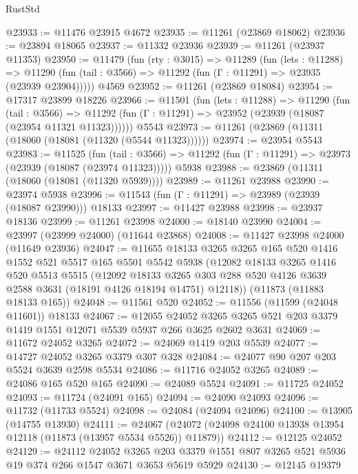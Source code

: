 \begin{lexlean}{RustStd}
\begin{coremodule}
@23933 := @11476 @23915 @4672
@23935 := @11261 (@23869 @18062)
@23936 := @23894 @18065
@23937 := @11332 @23936
@23939 := @11261 (@23937 @11353)
@23950 := @11479
    (fun (rty : @3015) =>
    @11289
      (fun (lets : @11288) =>
      @11290 (fun (tail : @3566) => @11292 (fun (Γ : @11291) => @23935 (@23939 @23904)))))
    @4569
@23952 := @11261 (@23869 @18084)
@23954 := @17317 @23899 @18226
@23966 := @11501
    (fun (lets : @11288) =>
    @11290
      (fun (tail : @3566) =>
      @11292 (fun (Γ : @11291) => @23952 (@23939 (@18087 (@23954 @11321 @11323))))))
    @5543
@23973 := @11261 (@23869 (@11311 (@18060 (@18081 (@11320 (@5544 @11323))))))
@23974 := @23954 @5543
@23983 := @11525
    (fun (tail : @3566) => @11292 (fun (Γ : @11291) => @23973 (@23939 (@18087 (@23974 @11323)))))
    @5938
@23988 := @23869 (@11311 (@18060 (@18081 (@11320 @5939))))
@23989 := @11261 @23988
@23990 := @23974 @5938
@23996 := @11543 (fun (Γ : @11291) => @23989 (@23939 (@18087 @23990))) @18133
@23997 := @11427 @23988
@23998 := @23937 @18136
@23999 := @11261 @23998
@24000 := @18140 @23990
@24004 := @23997 (@23999 @24000) (@11644 @23868)
@24008 := @11427 @23998 @24000 (@11649 @23936)
@24047 := @11655
    @18133
    @3265
    @3265
    @165
    @520
    @1416
    @1552
    @521
    @5517
    @165
    @5501
    @5542
    @5938
    (@12082
      @18133
      @3265
      @1416
      @520
      @5513
      @5515
      (@12092
        @18133
        @3265
        @303
        @288
        @520
        @4126
        @3639
        @2588
        @3631
        (@18191 @4126 @18194 @14751)
        @12118))
    (@11873 (@11883 @18133 @165))
@24048 := @11561 @520
@24052 := @11556 (@11599 (@24048 @11601)) @18133
@24067 := @12055
    @24052
    @3265
    @3265
    @521
    @203
    @3379
    @1419
    @1551
    @12071
    @5539
    @5937
    @266
    @3625
    @2602
    @3631
@24069 := @11672 @24052 @3265
@24072 := @24069 @1419 @203 @5539
@24077 := @14727 @24052 @3265 @3379 @307 @328
@24084 := @24077 @90 @207 @203 @5524 @3639 @2598 @5534
@24086 := @11716 @24052 @3265
@24089 := @24086 @165 @520 @165
@24090 := @24089 @5524
@24091 := @11725 @24052
@24093 := @11724 (@24091 @165)
@24094 := @24090 @24093
@24096 := @11732 (@11733 @5524)
@24098 := @24084 (@24094 @24096)
@24100 := @13905 (@14755 @13930)
@24111 := @24067 (@24072 (@24098 @24100 @13938 @13954 @12118 (@11873 (@13957 @5534 @5526)) @11879))
@24112 := @12125 @24052
@24129 := @24112
    @24052
    @3265
    @203
    @3379
    @1551
    @807
    @3265
    @521
    @5936
    @19
    @374
    @266
    @1547
    @3671
    @3653
    @5619
    @5929
@24130 := @12145 @19379

\end{coremodule}
\end{lexlean}
